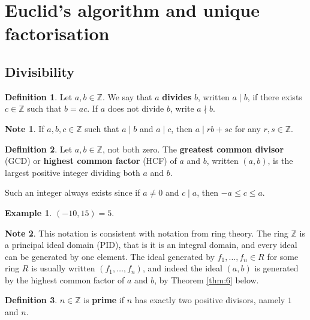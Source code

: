 \documentclass{article}
\newcommand{\Z}{\mathbb{Z}}
\newcommand{\rb}[1]{\left( #1 \right)}
\theoremstyle{definition}\newtheorem{definition}{Definition}
\theoremstyle{definition}\newtheorem{remark}[definition]{Remark}
\theoremstyle{definition}\newtheorem*{example}{Example}
\theoremstyle{definition}\newtheorem*{note}{Note}
\begin{document}
\section{Euclid's algorithm and unique factorisation}

\subsection{Divisibility}

\begin{definition}
Let $ a, b \in \Z $. We say that $ a $ \textbf{divides} $ b $, written $ a \mid b $, if there exists $ c \in \Z $ such that $ b = ac $. If $ a $ does not divide $ b $, write $ a \nmid b $.
\end{definition}

\begin{note}
If $ a, b, c \in \Z $ such that $ a \mid b $ and $ a \mid c $, then $ a \mid rb + sc $ for any $ r, s \in \Z $.
\end{note}

\begin{definition}
Let $ a, b \in \Z $, not both zero. The \textbf{greatest common divisor} (GCD) or \textbf{highest common factor} (HCF) of $ a $ and $ b $, written $ \rb{a, b} $, is the largest positive integer dividing both $ a $ and $ b $.
\end{definition}

Such an integer always exists since if $ a \ne 0 $ and $ c \mid a $, then $ -a \le c \le a $.

\begin{example}
$ \rb{-10, 15} = 5 $.
\end{example}

\begin{note}
This notation is consistent with notation from ring theory. The ring $ \Z $ is a principal ideal domain (PID), that is it is an integral domain, and every ideal can be generated by one element. The ideal generated by $ f_1, \dots, f_n \in R $ for some ring $ R $ is usually written $ \rb{f_1, \dots, f_n} $, and indeed the ideal $ \rb{a, b} $ is generated by the highest common factor of $ a $ and $ b $, by Theorem \ref{thm:6} below.
\end{note}

\begin{definition}
$ n \in \Z $ is \textbf{prime} if $ n $ has exactly two positive divisors, namely $ 1 $ and $ n $.
\end{definition}
\end{document}
